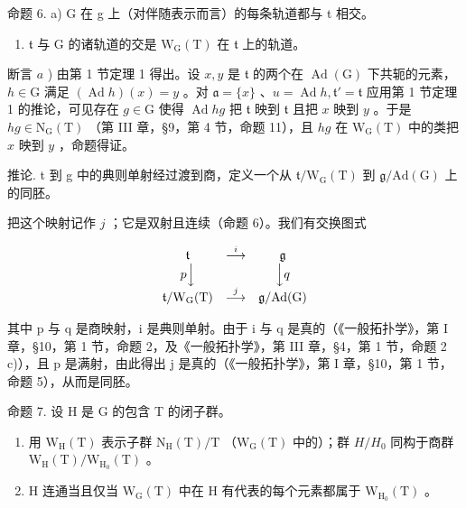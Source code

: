 命题 6. a) G 在 g 上（对伴随表示而言）的每条轨道都与 t 相交。

\begin{enumerate}
\def\labelenumi{\alph{enumi})}
\setcounter{enumi}{1}
\tightlist
\item
  \(\mathfrak{t}\) 与 \(\mathrm{G}\) 的诸轨道的交是 \(\mathrm{W_G(T)}\) 在 \(\mathfrak{t}\) 上的轨道。
\end{enumerate}

断言 \(a\) ) 由第 1 节定理 1 得出。设 \(x, y\) 是 \(\mathfrak{t}\) 的两个在 \(\operatorname{Ad}(\mathrm{G})\) 下共轭的元素，\(h \in \mathrm{G}\) 满足 \((\operatorname{Ad} h)(x) = y\) 。对 \(\mathfrak{a} = \{x\}\) 、\(u = \operatorname{Ad} h, \mathfrak{t}' = \mathfrak{t}\) 应用第 1 节定理 1 的推论，可见存在 \(g \in \mathrm{G}\) 使得 \(\operatorname{Ad} hg\) 把 \(\mathfrak{t}\) 映到 \(\mathfrak{t}\) 且把 \(x\) 映到 \(y\) 。于是 \(hg \in \mathrm{N}_{\mathrm{G}}(\mathrm{T})\) （第 III 章，§9，第 4 节，命题 11），且 \(hg\) 在 \(\mathrm{W}_{\mathrm{G}}(\mathrm{T})\) 中的类把 \(x\) 映到 \(y\) ，命题得证。

推论. t 到 g 中的典则单射经过渡到商，定义一个从 \(\mathfrak{t}/\mathrm{W}_{\mathrm{G}}(\mathrm{T})\) 到 \(\mathfrak{g}/\mathrm{Ad}(\mathrm{G})\) 上的同胚。

把这个映射记作 \(j\) ；它是双射且连续（命题 6）。我们有交换图式

\[
\begin{array}{c c c} \mathfrak {t} & \stackrel {{i}} {{\longrightarrow}} & \mathfrak {g} \\ p \Big \downarrow & & \Big \downarrow q \\ \mathfrak {t} / \mathrm{W} _ {\mathrm{G}} (\mathrm{T}) & \stackrel {{j}} {{\longrightarrow}} & \mathfrak {g} / \mathrm{Ad} (\mathrm{G}) \end{array}
\]

其中 p 与 q 是商映射，i 是典则单射。由于 i 与 q 是真的（《一般拓扑学》，第 I 章，§10，第 1 节，命题 2，及《一般拓扑学》，第 III 章，§4，第 1 节，命题 2 c)），且 p 是满射，由此得出 j 是真的（《一般拓扑学》，第 I 章，§10，第 1 节，命题 5），从而是同胚。

命题 7. 设 H 是 G 的包含 T 的闭子群。

\begin{enumerate}
\def\labelenumi{\alph{enumi})}
\item
  用 \(\mathrm{W}_{\mathrm{H}}(\mathrm{T})\) 表示子群 \(\mathrm{N}_{\mathrm{H}}(\mathrm{T})/\mathrm{T}\) （\(\mathrm{W}_{\mathrm{G}}(\mathrm{T})\) 中的）；群 \(H/H_{0}\) 同构于商群 \(\mathrm{W}_{\mathrm{H}}(\mathrm{T})/\mathrm{W}_{\mathrm{H}_{0}}(\mathrm{T})\) 。
\item
  H 连通当且仅当 \(\mathrm{W}_{\mathrm{G}}(\mathrm{T})\) 中在 H 有代表的每个元素都属于 \(\mathrm{W}_{\mathrm{H}_{0}}(\mathrm{T})\) 。
\end{enumerate}

